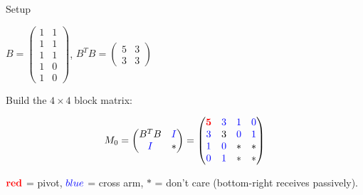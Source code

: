 \documentclass[10pt]{beamer}
\theoremstyle{definition}
\newcommand{\pvt}[1]{{\color{red}\mathbf{#1}}}       %
\newcommand{\crs}[1]{{\color{blue}#1}}                %
\newcommand{\bl}[1]{{\color{blue}#1}}                 %
\begin{document}
\begin{frame}{Setup}

$B = \begin{pmatrix} 1 & 1 \\ 1 & 1 \\ 1 & 1 \\ 1 & 0 \\ 1 & 0 \end{pmatrix}$, \quad
$B^TB = \begin{pmatrix} 5 & 3 \\ 3 & 3 \end{pmatrix}$

\vspace{0.5em}

Build the $4 \times 4$ block matrix:

$$M_0 = \begin{pmatrix} B^TB & \bl{I} \\ \bl{I} & * \end{pmatrix} = \begin{pmatrix} \pvt{5} & \crs{3} & \crs{\bl{1}} & \crs{\bl{0}} \\ \crs{3} & 3 & \bl{0} & \bl{1} \\ \crs{\bl{1}} & \bl{0} & * & * \\ \crs{\bl{0}} & \bl{1} & * & * \end{pmatrix}$$

\vspace{0.3em}

$\pvt{red}$ = pivot, $\crs{blue}$ = cross arm, $*$ = don't care (bottom-right receives passively).

\end{frame}
\end{document}
